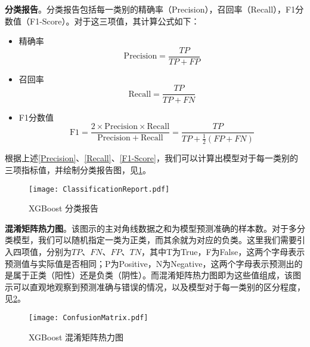 \documentclass{MathorCupModeling}
\begin{document}
\textbf{分类报告}。分类报告包括每一类别的精确率（Precision），召回率（Recall），F1分数值（F1-Score）。对于这三项值，其计算公式如下：
		\begin{itemize}
			\item {\heiti 精确率}
			\begin{equation}
				\mathrm{Precision} = \frac{TP}{TP+FP} \label{Precision}
			\end{equation}
			\item {\heiti 召回率}
			\begin{equation}
				\mathrm{Recall} = \frac{TP}{TP+FN} \label{Recall}
			\end{equation}
			\item {\heiti F1分数值} 
			\begin{equation}
				\mathrm{F}1 = \frac{2\times \mathrm{Precision}\times \mathrm{Recall}}{\mathrm{Precision}+\mathrm{Recall}}=\frac{TP}{TP+\frac{1}{2}\left(FP+FN\right)} \label{F1-Score}
			\end{equation}
		\end{itemize}
		根据上述\textcolor{blue}{\eqref{Precision}}、\textcolor{blue}{\eqref{Recall}}、\textcolor{blue}{\eqref{F1-Score}}，我们可以计算出模型对于每一类别的三项指标值，并绘制分类报告图，见\textcolor{blue}{\cref{fig:分类报告}}。
		\begin{figure}[H]
			\centering
			\texttt{[image: ClassificationReport.pdf]}
			\caption{XGBoost 分类报告}
			\label{fig:分类报告}
		\end{figure}

\textbf{混淆矩阵热力图}。该图示的主对角线数据之和为模型预测准确的样本数。对于多分类模型，我们可以随机指定一类为正类，而其余就为对应的负类。这里我们需要引入四项值，分别为$TP$、$FN$、$FP$、$TN$，其中T为True，F为False，这两个字母表示预测值与实际值是否相同；P为Positive，N为Negative，这两个字母表示预测出的是属于正类（阳性）还是负类（阴性）。而混淆矩阵热力图即为这些值组成，该图示可以直观地观察到预测准确与错误的情况，以及模型对于每一类别的区分程度，见\textcolor{blue}{\cref{fig:混淆矩阵热力图}}。
		\begin{figure}[H]
			\centering
			\texttt{[image: ConfusionMatrix.pdf]}
			\caption{XGBoost 混淆矩阵热力图}
			\label{fig:混淆矩阵热力图}
		\end{figure}
\end{document}
